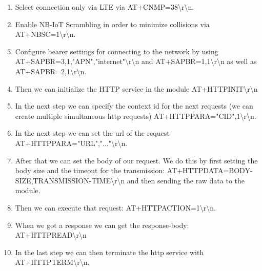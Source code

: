\begin{enumerate}
    \item   Select connection only via LTE via AT+CNMP=38\textbackslash{}r\textbackslash{}n.
    \item  Enable NB-IoT Scrambling in order to minimize collisions via \newline{}AT+NBSC=1\textbackslash{}r\textbackslash{}n.
    \item  Configure bearer settings for connecting to the network by using \newline{}AT+SAPBR=3,1,"APN","internet"\textbackslash{}r\textbackslash{}n and AT+SAPBR=1,1\textbackslash{}r\textbackslash{}n as well as AT+SAPBR=2,1\textbackslash{}r\textbackslash{}n.
    \item Then we can initialize the HTTP service in the module \newline{}AT+HTTPINIT\textbackslash{}r\textbackslash{}n
    \item In the next step we can specify the context id for the next requests (we can create multiple simultaneous http requests) \newline{}AT+HTTPPARA="CID",1\textbackslash{}r\textbackslash{}n.
    \item In the next step we can set the url of the request \newline{}AT+HTTPPARA="URL","..."\textbackslash{}r\textbackslash{}n.
    \item After that we can set the body of our request. We do this by first setting the body size and the timeout for the transmission: \newline{}AT+HTTPDATA=BODY-SIZE,TRANSMISSION-TIME\textbackslash{}r\textbackslash{}n and then sending the raw data to the module.
    \item  Then we can execute that request: \newline{}AT+HTTPACTION=1\textbackslash{}r\textbackslash{}n.
    \item When we got a response we can get the response-body: \newline{}AT+HTTPREAD\textbackslash{}r\textbackslash{}n
    \item In the last step we can then terminate the http service with \newline{}AT+HTTPTERM\textbackslash{}r\textbackslash{}n.
\end{enumerate}
